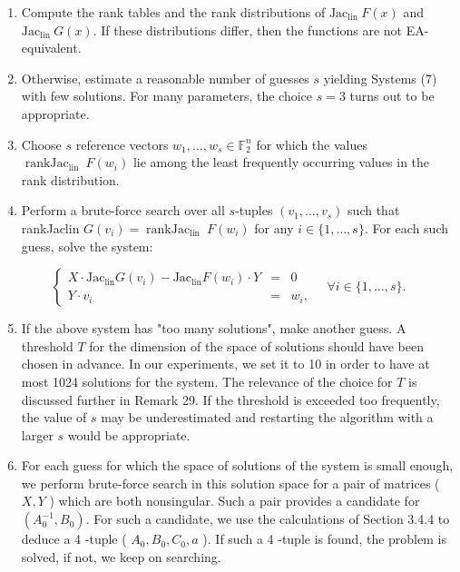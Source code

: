 \documentclass[10pt]{article}
\begin{document}
\begin{enumerate}
  \item Compute the rank tables and the rank distributions of $\mathrm{Jac}_{\text {lin }} F(x)$ and $\mathrm{Jac}_{\text {lin }} G(x)$. If these distributions differ, then the functions are not EA-equivalent.
  \item Otherwise, estimate a reasonable number of guesses $s$ yielding Systems (7) with few solutions. For many parameters, the choice $s=3$ turns out to be appropriate.
  \item Choose $s$ reference vectors $w_{1}, \ldots, w_{s} \in \mathbb{F}_{2}^{n}$ for which the values $\operatorname{rankJac}_{\text {lin }} F\left(w_{i}\right)$ lie among the least frequently occurring values in the rank distribution.
  \item Perform a brute-force search over all $s$-tuples $\left(v_{1}, \ldots, v_{s}\right)$ such that rankJaclin $G\left(v_{i}\right)= \operatorname{rankJac}_{\text {lin }} F\left(w_{i}\right)$ for any $i \in\{1, \ldots, s\}$. For each such guess, solve the system:
\end{enumerate}

$$
\left\{\begin{array}{ccc}
X \cdot \mathrm{Jac}_{\operatorname{lin}} G\left(v_{i}\right)-\mathrm{Jac}_{\operatorname{lin}} F\left(w_{i}\right) \cdot Y & = & 0 \\
Y \cdot v_{i} & = & w_{i},
\end{array} \quad \forall i \in\{1, \ldots, s\} .\right.
$$

\begin{enumerate}
  \setcounter{enumi}{4}
  \item If the above system has "too many solutions", make another guess. A threshold $T$ for the dimension of the space of solutions should have been chosen in advance. In our experiments, we set it to 10 in order to have at most 1024 solutions for the system. The relevance of the choice for $T$ is discussed further in Remark 29. If the threshold is exceeded too frequently, the value of $s$ may be underestimated and restarting the algorithm with a larger $s$ would be appropriate.
  \item For each guess for which the space of solutions of the system is small enough, we perform brute-force search in this solution space for a pair of matrices ( $X, Y$ ) which are both nonsingular. Such a pair provides a candidate for $\left(A_{0}^{-1}, B_{0}\right)$. For such a candidate, we use the calculations of Section 3.4.4 to deduce a 4 -tuple ( $A_{0}, B_{0}, C_{0}, a$ ). If such a 4 -tuple is found, the problem is solved, if not, we keep on searching.
\end{enumerate}
\end{document}
